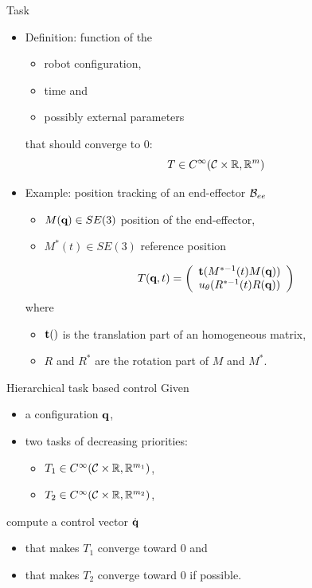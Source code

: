 %
%

\begin{frame} {Task}
  \begin {itemize}
    \item Definition: function of the
      \begin {itemize}
        \item robot configuration, 
        \item time and
        \item possibly external parameters
      \end{itemize}
      that should converge to 0:
      $$
      T \in C^{\infty} ({\cal C}\times\mathbb{R}, \mathbb{R}^m)
      $$
      \pause
      \item Example: position tracking of an end-effector ${\cal B}_{ee}$
        \pause
        \begin{itemize}
        \item $M (\textbf{q}) \in SE(3)$ position of the end-effector,
        \pause
        \item $M^{*} (t) \in SE(3)$ reference position
        \end{itemize}
        \pause
        $$
        T (\textbf{q}, t) = \left(\begin{array}{cc}
          \textbf{t} (M^{* -1}(t) M (\textbf{q})) \\
          u_{\theta} (R^{* -1}(t) R (\textbf{q}))
        \end{array}\right)
        $$
        where
        \begin{itemize}
          \item $\textbf{t} ()$ is the translation part of an homogeneous matrix,
          \item $R$ and $R^{*}$ are the rotation part of $M$ and $M^{*}$.
        \end{itemize}
        
  \end {itemize}
\end{frame}

%
%

\begin{frame} {Hierarchical task based control}
  Given
  \begin{itemize}
  \item a configuration $\textbf{q}$,
  \item two tasks of decreasing priorities:
    \begin{itemize}
      \item $T_1 \in C^{\infty}({\cal C}\times\mathbb{R}, \mathbb{R}^{m_1})$,
      \item $T_2 \in C^{\infty}({\cal C}\times\mathbb{R}, \mathbb{R}^{m_2})$,
    \end{itemize}
  \end{itemize}
  \pause
  compute a control vector $\dot{\textbf{q}}$
  \begin{itemize}
    \item that makes $T_1$ converge toward 0 and
    \item that makes $T_2$ converge toward 0 if possible.
  \end{itemize}
\end{frame}

